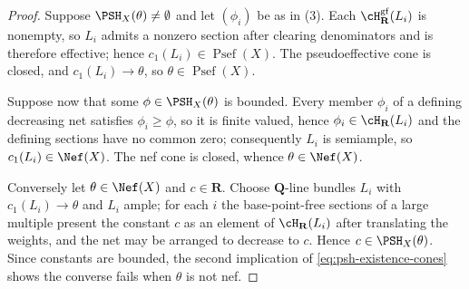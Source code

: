 \begin{proof}
Suppose \(\PSH_X(\theta)\ne\emptyset\) and let \((\phi_i)\) be as in
(3).  Each \(\cH^{\mathrm{gf}}_{\mathbf R}(L_i)\) is
nonempty, so \(L_i\) admits a nonzero section after clearing denominators
and is therefore effective; hence \(c_1(L_i)\in\operatorname{Psef}(X)\).  The
pseudoeffective cone is closed, and \(c_1(L_i)\to\theta\), so
\(\theta\in\operatorname{Psef}(X)\).

Suppose now that some \(\phi\in\PSH_X(\theta)\) is bounded.  Every member
\(\phi_i\) of a defining decreasing net satisfies \(\phi_i\geq\phi\), so it
is finite valued, hence
\(\phi_i\in\cH_{\mathbf R}(L_i)\) and the defining sections have no common
zero; consequently \(L_i\) is semiample, so \(c_1(L_i)\in\Nef(X)\).  The nef
cone is closed, whence \(\theta\in\Nef(X)\).

Conversely let \(\theta\in\Nef(X)\) and \(c\in\mathbf R\).  Choose
\(\mathbf Q\)-line bundles \(L_i\) with \(c_1(L_i)\to\theta\) and \(L_i\)
ample; for each \(i\) the base-point-free sections of a large multiple
present the constant \(c\) as an element of \(\cH_{\mathbf R}(L_i)\) after
translating the weights, and the net may be arranged to decrease to \(c\).
Hence \(c\in\PSH_X(\theta)\).  Since constants are bounded, the second
implication of \eqref{eq:psh-existence-cones} shows the converse fails when
\(\theta\) is not nef.
\end{proof}
